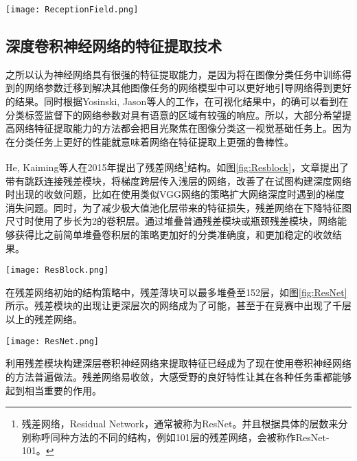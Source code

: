 \begin{figure*}[htbp]	
	\centering
	\texttt{[image: ReceptionField.png]}
	\caption{两种可视化感受野的方法\cite{fang2017reception}}
	\label{fig:ReceptionField}
\end{figure*}

\subsection{深度卷积神经网络的特征提取技术}
\label{subsec:factsdeepextract}
之所以认为神经网络具有很强的特征提取能力，是因为将在图像分类任务中训练得到的网络参数迁移到解决其他图像任务的网络模型中可以更好地引导网络得到更好的结果\cite{mishkin2015all}。同时根据Yosinski, Jason等人的工作\cite{yosinski2015understanding}，在可视化结果中，的确可以看到在分类标签监督下的网络参数对具有语意的区域有较强的响应。所以，大部分希望提高网络特征提取能力的方法都会把目光聚焦在图像分类这一视觉基础任务上。因为在分类任务上更好的性能就意味着网络在特征提取上更强的鲁棒性。

He, Kaiming等人在2015年提出了残差网络\footnote{残差网络，Residual Network，通常被称为ResNet。并且根据具体的层数来分别称呼同种方法的不同的结构，例如101层的残差网络，会被称作ResNet-101。}结构\cite{He2015Deep}。如图\ref{fig:Resblock}，文章提出了带有跳跃连接残差模块，将梯度跨层传入浅层的网络，改善了在试图构建深度网络时出现的收敛问题，比如在使用类似VGG网络\cite{simonyan2014very}的策略扩大网络深度时遇到的梯度消失问题。同时，为了减少极大值池化层带来的特征损失，残差网络在下降特征图尺寸时使用了步长为2的卷积层。通过堆叠普通残差模块或瓶颈残差模块，网络能够获得比之前简单堆叠卷积层的策略更加好的分类准确度，和更加稳定的收敛结果。

\begin{figure*}[htbp]	
	\centering
	\texttt{[image: ResBlock.png]}
	\caption{残差模块结构：左图为普通残差模块，右图为瓶颈残差模块}
	\label{fig:Resblock}
\end{figure*}

在残差网络初始的结构策略中，残差薄块可以最多堆叠至152层，如图\ref{fig:ResNet}所示。残差模块的出现让更深层次的网络成为了可能，甚至于在竞赛中出现了千层以上的残差网络。

\begin{figure*}[htbp]	
	\centering
	\texttt{[image: ResNet.png]}
	\caption{残差网络结构策略}
	\label{fig:ResNet}
\end{figure*}

利用残差模块构建深层卷积神经网络来提取特征已经成为了现在使用卷积神经网络的方法普遍做法。残差网络易收敛，大感受野的良好特性让其在各种任务重都能够起到相当重要的作用。

